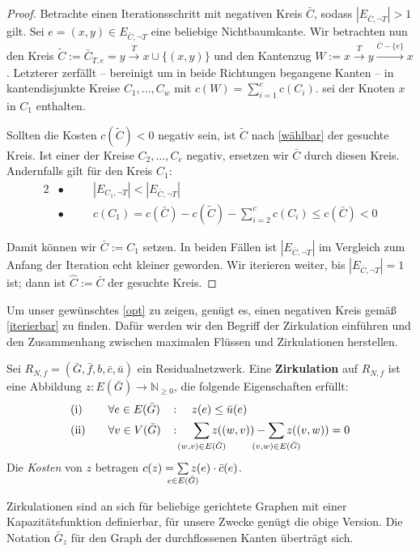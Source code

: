 \begin{proof}
Betrachte einen Iterationsschritt mit negativen Kreis $\bar{C}$, sodass $|E_{\bar{C},\neg T}|>1$ gilt. Sei $e=(x,y)\in E_{\bar{C},\neg T}$ eine beliebige Nichtbaumkante. Wir betrachten nun den Kreis $\tilde{C}:=\bar{C}_{T,e}=y\xrightarrow{T}x\cup\{(x,y)\}$ und den Kantenzug $W:=x\xrightarrow{T}y\xrightarrow{\bar{C}-\{e\}}x$. Letzterer zerfällt -- bereinigt um in beide Richtungen begangene Kanten -- in kantendisjunkte Kreise $C_1,\ldots,C_w$ mit $c(W)=\sum_{i=1}^{c} c(C_i)$. \Obda sei der Knoten $x$ in $C_1$ enthalten.

Sollten die Kosten $c(\tilde{C})<0$ negativ sein, ist $\tilde{C}$ nach \cref{wählbar} der gesuchte Kreis. Ist einer der Kreise $C_2,\ldots,C_c$ negativ, ersetzen wir $\bar{C}$ durch diesen Kreis. Andernfalls gilt für den Kreis $C_1$:
\begin{alignat*}{2}
&\bullet\quad&&|E_{C_1,\neg T}|<|E_{\bar{C},\neg T}|\\
&\bullet\quad&&c(C_1)=c(\bar{C})-c(\tilde{C})-\sum_{i=2}^{c}c(C_i)\leq c(\bar{C})<0
\end{alignat*}

Damit können wir $\bar{C}:=C_1$ setzen. In beiden Fällen ist $|E_{\bar{C},\neg T}|$ im Vergleich zum Anfang der Iteration echt kleiner geworden. Wir iterieren weiter, bis $|E_{\bar{C},\neg T}|=1$ ist; dann ist $\hat{C}:=\bar{C}$ der gesuchte Kreis.\end{proof}

Um unser gewünschtes \cref{opt} zu zeigen, genügt es, einen negativen Kreis gemäß \cref{iterierbar} zu finden. Dafür werden wir den Begriff der Zirkulation einführen und den Zusammenhang zwischen maximalen Flüssen und Zirkulationen herstellen.

\begin{defn}\label{zirk}Sei $R_{N,f}= (\bar{G},\bar{f},b,\bar{c},\bar{u})$ ein Residualnetzwerk. Eine \textbf{Zirkulation} auf $R_{N,f}$ ist eine Abbildung $z \colon E(\bar{G})\rightarrow\mathbb{N}_{\geq0}$, die folgende Eigenschaften erfüllt:
\begin{alignat}{3}
&\text{(i)}\quad&&\forall e\in E(\bar{G}) &&\colon\quad z(e)\leq \bar{u}(e)\label{zirkI}\\
&\text{(ii)}\quad&&\forall v\in V(\bar{G}) &&\colon\quad \sum_{\mathclap{(w,v)\in E(\bar{G})}} z((w,v)) - \sum_{\mathclap{(v,w)\in E(\bar{G})}} z((v,w)) = 0\label{zirkII}
\end{alignat}
Die \emph{Kosten} von $z$ betragen $c(z) = \sum\limits_{\mathclap{e\in E(\bar{G})}} z(e)\cdot \bar{c}(e)$.
\end{defn}
\begin{anm}Zirkulationen sind an sich für beliebige gerichtete Graphen mit einer Kapazitätsfunktion definierbar, für unsere Zwecke genügt die obige Version. Die Notation $\bar{G}_z$ für den Graph der durchflossenen Kanten überträgt sich.\end{anm}

